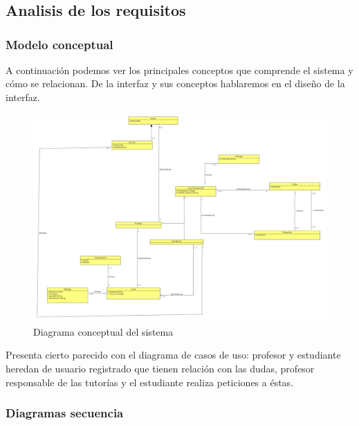 
\chapter{}

\section{Analisis de los requisitos}
    
    \subsection{Modelo conceptual}

A continuación podemos ver los principales conceptos que comprende el sistema y cómo se relacionan. De la interfaz y sus conceptos hablaremos en el diseño de la interfaz.


 \begin{figure}[H] %
\includegraphics[width=1.1\textwidth, right]{imagenes/diagramas/diagrama_conceptual.png}  %
\caption{Diagrama conceptual del sistema}\label{figura197}
\end{figure}


Presenta cierto parecido con el diagrama de casos de uso: profesor y estudiante heredan de usuario registrado que tienen relación con las dudas, profesor responsable de las tutorías y el estudiante realiza peticiones a éstas.

\subsection{Diagramas secuencia}

